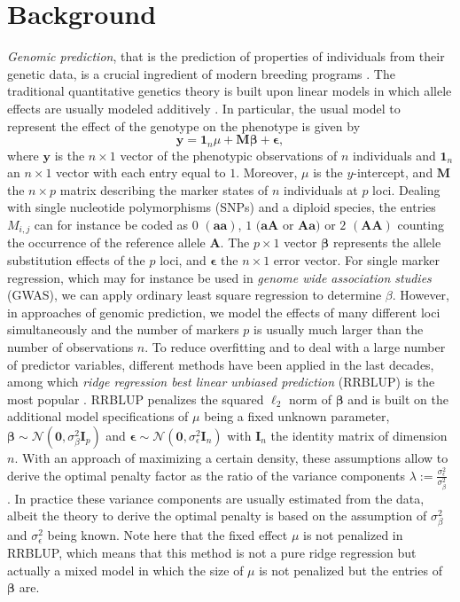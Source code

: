 \documentclass{bmcart}
\newcommand{\M}{\mathbf{M}}
\newcommand{\0}{\mathbf{0}}
\begin{document}
\section*{Background}
\emph{Genomic prediction}, that is the prediction of properties of individuals from their genetic data, is a crucial ingredient of modern breeding programs \cite{meuwissen01,schaeffer06,habier07,hayes09a,hayes13}.
The traditional quantitative genetics theory is built upon linear models in which allele effects are usually modeled additively \cite{falconer96}.
In particular,
the usual model to represent the effect of the genotype on the phenotype is given by
\begin{equation} \label{eq:01}
	\mathbf{y}=\mathbf{1}_n \mu + \M \bm{\beta} + \bm{\epsilon},
\end{equation} 
where $\mathbf{y}$ is the $n \times 1$ vector of the phenotypic observations of $n$ individuals and $\mathbf{1}_n$ an $n \times 1$ vector with each entry equal to $1$.  Moreover,
$\mu$ is the $y$-intercept, and $\M$  the  $n \times p$ matrix describing the marker states of $n$ individuals at $p$ loci. Dealing with single nucleotide polymorphisms (SNPs) and a diploid species, the entries $M_{i,j}$ can for instance be coded as $0$ $(\mathbf{aa})$, $1$ $(\mathbf{aA}$ or $\mathbf{Aa})$ or $2$ $(\mathbf{AA})$ counting the occurrence of the reference allele $\mathbf{A}$. The $p \times 1$ vector $\bm{\beta}$ represents the allele substitution effects of the $p$ loci, and $\bm{\epsilon}$ the $n \times 1$ error vector. For single marker regression, which may for instance be used in \emph{genome wide association studies} (GWAS), we can apply ordinary least square regression to determine $\beta$. 
However, in approaches of genomic prediction, we model the effects of many different loci simultaneously and the number of markers $p$ is usually much larger than the number of observations $n$. To reduce overfitting and to deal with a large number of predictor variables, different methods have been applied in the last decades, among which \emph{ridge regression best linear unbiased prediction} (RRBLUP) is the most popular \cite{schaeffer2004application}. RRBLUP penalizes the squared $\ell_2$ norm of $\bm{\beta}$ and is built on the additional model specifications of $\mu$ being a fixed unknown parameter, $\bm{\beta}\sim \mathcal{N}(\bm{0},\sigma_\beta^2 \mathbf{I}_p)$ and $\bm{\epsilon}\sim \mathcal{N}(\bm{0},\sigma_\epsilon^2 \mathbf{I}_n)$ with $\mathbf{I}_n$ the identity matrix of dimension $n$.
With an approach of maximizing a certain density, these assumptions allow to derive the optimal penalty factor as the ratio of the variance components $\lambda:= \frac{\sigma_\epsilon^2}{\sigma_\beta^2}$ \cite{henderson75,henderson76,henderson77}. In practice these variance components are usually estimated from the data, albeit the theory to derive the optimal penalty is based on the assumption of $\sigma_\beta^2$ and $\sigma_\epsilon^2$ being known. Note here that the fixed effect $\mu$ is not penalized in RRBLUP, which means that this method is not a pure ridge regression but actually a mixed model in which the size of $\mu$ is not penalized but the entries of $\bm{\beta}$ are.  
\end{document}
